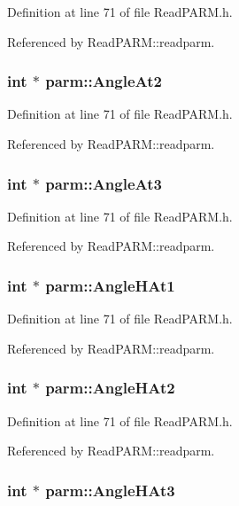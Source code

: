 Definition at line 71 of file Read\-PARM.h.

Referenced by Read\-PARM::readparm.
\subsubsection{\setlength{\rightskip}{0pt plus 5cm}int $\ast$ parm::Angle\-At2}\label{structparm_m73}




Definition at line 71 of file Read\-PARM.h.

Referenced by Read\-PARM::readparm.
\subsubsection{\setlength{\rightskip}{0pt plus 5cm}int $\ast$ parm::Angle\-At3}\label{structparm_m74}




Definition at line 71 of file Read\-PARM.h.

Referenced by Read\-PARM::readparm.
\subsubsection{\setlength{\rightskip}{0pt plus 5cm}int $\ast$ parm::Angle\-HAt1}\label{structparm_m68}




Definition at line 71 of file Read\-PARM.h.

Referenced by Read\-PARM::readparm.
\subsubsection{\setlength{\rightskip}{0pt plus 5cm}int $\ast$ parm::Angle\-HAt2}\label{structparm_m69}




Definition at line 71 of file Read\-PARM.h.

Referenced by Read\-PARM::readparm.
\subsubsection{\setlength{\rightskip}{0pt plus 5cm}int $\ast$ parm::Angle\-HAt3}\label{structparm_m70}




